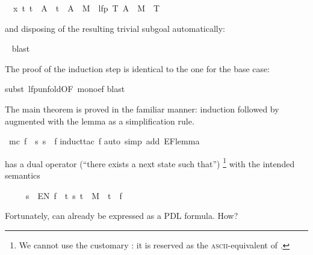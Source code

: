 \begin{isabellebody}
\begin{isamarkuptxt}
\begin{isabelle}
\ {}{\isachardot}\ {\isasymAnd}x\ t{\isachardot}\ t\ {\isasymin}\ A\ {\isasymLongrightarrow}\ t\ {\isasymin}\ A\ {\isasymunion}\ M{\isasyminverse}\ {\isacharbackquote}{\isacharbackquote}\ lfp\ {\isacharparenleft}{\isasymlambda}T{\isachardot}\ A\ {\isasymunion}\ M{\isasyminverse}\ {\isacharbackquote}{\isacharbackquote}\ T{\isacharparenright}%
\end{isabelle}
and disposing of the resulting trivial subgoal automatically:%
\end{isamarkuptxt}%
\ \isamarkuptrue%
blast{\isacharparenright}\isamarkupfalse%
%
\begin{isamarkuptxt}%
\noindent
The proof of the induction step is identical to the one for the base case:%
\end{isamarkuptxt}%
\isamarkuptrue%
subst\ lfp{\isacharunderscore}unfold{\isacharbrackleft}OF\ mono{\isacharunderscore}ef{\isacharbrackright}{\isacharparenright}\isanewline
\isamarkupfalse%
blast{\isacharparenright}\isanewline
\isamarkupfalse%
\isamarkupfalse%
%
\begin{isamarkuptext}%
The main theorem is proved in the familiar manner: induction followed by
 augmented with the lemma as a simplification rule.%
\end{isamarkuptext}%
\isamarkuptrue%
\ {\isachardoublequote}mc\ f\ {\isacharequal}\ {\isacharbraceleft}s{\isachardot}\ s\ {\isasymTurnstile}\ f{\isacharbraceright}{\isachardoublequote}\isanewline
\isamarkupfalse%
induct{\isacharunderscore}tac\ f{\isacharparenright}\isanewline
\isamarkupfalse%
auto\ simp\ add{\isacharcolon}\ EF{\isacharunderscore}lemma{\isacharparenright}\isanewline
\isamarkupfalse%
\isamarkupfalse%
%
\begin{isamarkuptext}%
\begin{exercise}
 has a dual operator  
(``there exists a next state such that'')%
\footnote{We cannot use the customary : it is reserved
as the \textsc{ascii}-equivalent of \isa{{\isasymexists}}.}
with the intended semantics
\begin{isabelle}%
\ \ \ \ \ s\ {\isasymTurnstile}\ EN\ f\ {\isacharequal}\ {\isacharparenleft}{\isasymexists}t{\isachardot}\ {\isacharparenleft}s{\isacharcomma}\ t{\isacharparenright}\ {\isasymin}\ M\ {\isasymand}\ t\ {\isasymTurnstile}\ f{\isacharparenright}%
\end{isabelle}
Fortunately,  can already be expressed as a PDL formula. How?


\end{exercise}
\end{isamarkuptext}
\end{isabellebody}

